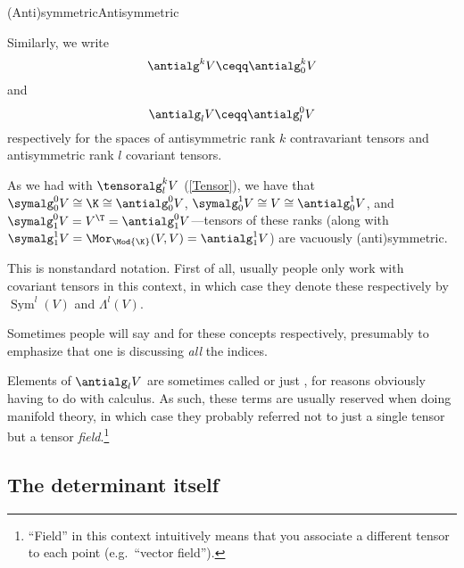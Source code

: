 \begin{dfn}{(Anti)symmetric}{Antisymmetric}
\begin{rmk}
		Similarly, we write
		\begin{equation}
		\antialg ^kV\ceqq \antialg _0^kV
		\end{equation}
		and
		\begin{equation}
		\antialg _lV\ceqq \antialg _l^0V
		\end{equation}
		respectively for the spaces of antisymmetric rank $k$ contravariant tensors and antisymmetric rank $l$ covariant tensors.
	\end{rmk}
	\begin{rmk}
		As we had with $\tensoralg _l^kV$ (\cref{Tensor}), we have that $\symalg _0^0V\cong \K \cong \antialg _0^0V$, $\symalg _0^1V\cong V\cong \antialg _0^1V$, and $\symalg _1^0V=V^{\T}=\antialg _1^0V$---tensors of these ranks (along with $\symalg _1^1V=\Mor _{\Mod{\K}}(V,V)=\antialg _1^1V$) are vacuously (anti)symmetric.
	\end{rmk}
	\begin{rmk}
		This is nonstandard notation.  First of all, usually people only work with covariant tensors in this context, in which case they denote these respectively by $\operatorname{Sym}^l(V)$ and $\Lambda ^l(V)$.
	\end{rmk}
	\begin{rmk}
		Sometimes people will say  and  for these concepts respectively, presumably to emphasize that one is discussing \emph{all} the indices.
	\end{rmk}
	\begin{rmk}
		Elements of $\antialg _lV$ are sometimes called  or just , for reasons obviously having to do with calculus.  As such, these terms are usually reserved when doing manifold theory, in which case they probably referred not to just a single tensor but a tensor \emph{field}.\footnote{``Field'' in this context intuitively means that you associate a different tensor to each point (e.g.~``vector field'').}
	\end{rmk}
\end{dfn}

\subsection{The determinant itself}

